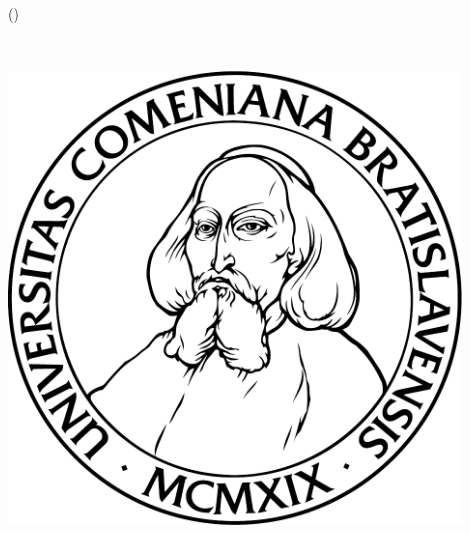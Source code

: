\thispagestyle{empty}
\noindent
\begin{center}
	\sc \mfuniversity \\
	\mffaculty \\
	\mfdepartment
\end{center}
\vfill
\begin{center}
	\begin{minipage}{0.8\textwidth}
		\bigskip\bigskip
		\centerline{\LARGE\sc\mftitlea}
		\centerline{\LARGE\sc\mftitleb}
		\smallskip
		\centerline{(\mfthesistype)}
	\end{minipage}
\end{center}
\vfill
{\bf
\begin{minipage}{0.4\textwidth}
\begin{flushleft} \large
~\mfyear
\end{flushleft}
\end{minipage}
\begin{minipage}{0.59\textwidth}
\begin{flushright} \large
\mfauthor
\end{flushright}
\end{minipage}
}
\eject
\ifx\draft\undefined
\thispagestyle{empty}
\begin{minipage}{0.20\textwidth}
	\includegraphics[width=0.9\textwidth]{../figures/logouni}
\end{minipage}

